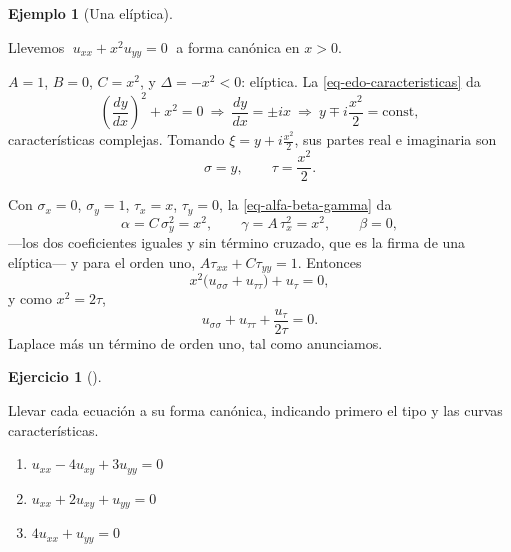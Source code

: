\documentclass[
  spanish,
  a4paper,
]{scrbook}
\providecommand{\tightlist}{%
  \setlength{\itemsep}{0pt}\setlength{\parskip}{0pt}}
\theoremstyle{definition}
\theoremstyle{plain}
\theoremstyle{definition}
\newtheorem{example}{Ejemplo}[chapter]
\theoremstyle{plain}
\theoremstyle{definition}
\newtheorem{exercise}{Ejercicio}[chapter]
\theoremstyle{remark}
\begin{document}
\begin{example}[Una
elíptica]\protect\hypertarget{exm-canonica-eliptica}{}\label{exm-canonica-eliptica}

Llevemos \(\;u_{xx} + x^2u_{yy} = 0\;\) a forma canónica en \(x>0\).

\(A=1\), \(B=0\), \(C=x^2\), y \(\Delta = -x^2 < 0\): elíptica. La
\ref{eq-edo-caracteristicas} da
\[\left(\frac{dy}{dx}\right)^2 + x^2 = 0 \ \Longrightarrow\ \frac{dy}{dx} = \pm ix
\ \Longrightarrow\ y \mp i\frac{x^2}{2} = \text{const},\]
características complejas. Tomando \(\xi = y + i\frac{x^2}{2}\), sus
partes real e imaginaria son
\[\sigma = y, \qquad \tau = \frac{x^2}{2} .\]

Con \(\sigma_x=0\), \(\sigma_y=1\), \(\tau_x=x\), \(\tau_y=0\), la
\ref{eq-alfa-beta-gamma} da
\[\alpha = C\,\sigma_y^2 = x^2, \qquad \gamma = A\,\tau_x^2 = x^2, \qquad \beta = 0,\]
---los dos coeficientes iguales y sin término cruzado, que es la firma
de una elíptica--- y para el orden uno, \(A\tau_{xx} + C\tau_{yy} = 1\).
Entonces \[
x^2\big(u_{\sigma\sigma} + u_{\tau\tau}\big) + u_\tau = 0 ,
\] y como \(x^2 = 2\tau\), \[
u_{\sigma\sigma} + u_{\tau\tau} + \frac{u_\tau}{2\tau} = 0 .
\] Laplace más un término de orden uno, tal como anunciamos.

\end{example}

\begin{exercise}[]\protect\hypertarget{exr-canonica-practica}{}\label{exr-canonica-practica}

Llevar cada ecuación a su forma canónica, indicando primero el tipo y
las curvas características.

\begin{enumerate}
\def\labelenumi{\alph{enumi}.}
\tightlist
\item
  \(u_{xx} - 4u_{xy} + 3u_{yy} = 0\)
\item
  \(u_{xx} + 2u_{xy} + u_{yy} = 0\)
\item
  \(4u_{xx} + u_{yy} = 0\)
\end{enumerate}

\end{exercise}
\end{document}
